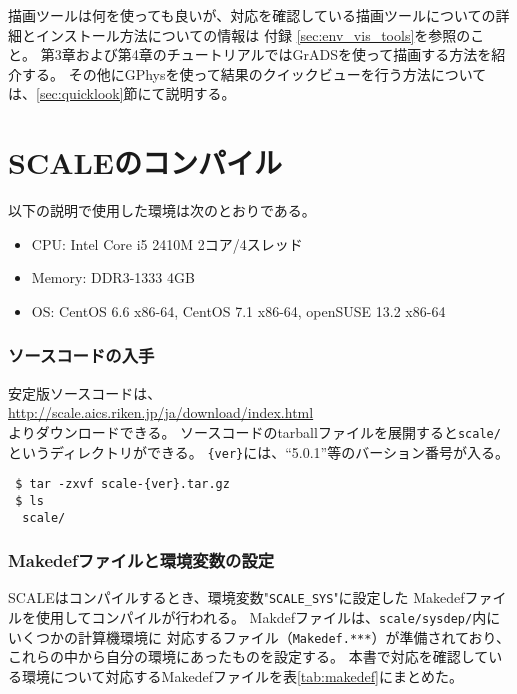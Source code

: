 描画ツールは何を使っても良いが、対応を確認している描画ツールについての詳細とインストール方法についての情報は
付録 \ref{sec:env_vis_tools}を参照のこと。
第3章および第4章のチュートリアルではGrADSを使って描画する方法を紹介する。
その他にGPhysを使って結果のクイックビューを行う方法については、\ref{sec:quicklook}節にて説明する。



\section{SCALEのコンパイル} \label{sec:source_code}


以下の説明で使用した環境は次のとおりである。
\begin{itemize}
\item CPU: Intel Core i5 2410M 2コア/4スレッド
\item Memory: DDR3-1333 4GB
\item OS: CentOS 6.6 x86-64, CentOS 7.1 x86-64, openSUSE 13.2 x86-64
\end{itemize}

\subsubsection{ソースコードの入手}
安定版ソースコードは、\\
 \url{http://scale.aics.riken.jp/ja/download/index.html}\\
よりダウンロードできる。
ソースコードのtarballファイルを展開すると\verb|scale/|というディレクトリができる。
\verb|{ver}|には、``5.0.1''等のバーション番号が入る。
\begin{verbatim}
 $ tar -zxvf scale-{ver}.tar.gz
 $ ls
  scale/
\end{verbatim}



\subsubsection{Makedefファイルと環境変数の設定}

SCALEはコンパイルするとき、環境変数"\verb|SCALE_SYS|"に設定した
Makedefファイルを使用してコンパイルが行われる。
Makdefファイルは、\verb|scale/sysdep/|内にいくつかの計算機環境に
対応するファイル（\verb|Makedef.***|）が準備されており、これらの中から自分の環境にあったものを設定する。
本書で対応を確認している環境について対応するMakedefファイルを表\ref{tab:makedef}にまとめた。

